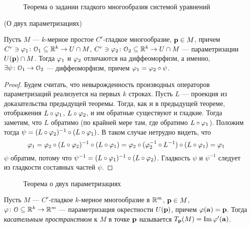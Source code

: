 \begin{figure}[ht]
    \centering
    \caption{Теорема о задании гладкого многообразия системой уравнений}
\end{figure}

\begin{corollary}(О двух параметризациях)

    Пусть $M$ --- $k$-мерное простое $C^r$-гладкое многообразие, $\mathbf{p} \in M$,
    причем $C^r \ni \varphi_1 \colon \mathcal{O}_1 \subseteq \mathbb{R}^k \to U \cap M$,
    $C^r \ni \varphi_2 \colon \mathcal{O}_2 \subseteq \mathbb{R}^k \to U \cap M$ --- параметризации
    $U(\mathbf{p}) \cap M$. Тогда $\varphi_1$ и $\varphi_2$ отличаются на диффеоморфизм, а
    именно, $\exists \psi \colon \mathcal{O}_1 \to \mathcal{O}_2$ --- диффеоморфизм, причем
    $\varphi_1 = \varphi_2 \circ \psi$.
\end{corollary}
\begin{proof}
    Будем считать, что невырожденность производных операторов параметризаций
    реализуется на первых $k$ строках. Пусть $L$ --- проекция из доказательства
    предыдущей теоремы. Тогда, как и в предыдущей теореме, отображения
    $L \circ \varphi_1$, $L \circ \varphi_2$, и им обратные существуют и гладкие.
    Тогда заметим, что $L$ обратимо (по крайней мере там, где обратимо $L \circ \varphi_1$).
    Положим тогда $\psi = (L \circ \varphi_2)^{-1} \circ (L \circ \varphi_1)$. В таком случае
    нетрудно видеть, что
\[
    \varphi_1 = \varphi_2 \circ (L \circ \varphi_2)^{-1} \circ (L \circ \varphi_1) =
    \varphi_2 \circ (\varphi_2^{-1} \circ L^{-1}) \circ (L \circ \varphi_1) = \varphi_1
\]
    $\psi$ обратим, потому что $\psi^{-1} = (L \circ \varphi_1)^{-1} \circ (L \circ \varphi_2)$.
    Гладкость $\psi$ и $\psi^{-1}$ следует из гладкости составных частей $\psi$.
\end{proof}

\begin{figure}[ht]
    \centering
    \caption{Теорема о двух параметризациях}
\end{figure}

\newpage

\begin{definition}

    Пусть $M$ --- $C^r$-гладкое $k$-мерное многообразие в $\mathbb{R}^m$, $\mathbf{p} \in M$,
    \\ $\varphi \colon \mathcal{O} \subseteq \mathbb{R}^k \to \mathbb{R}^m$ --- параметризация окрестности
    $U(\mathbf{p})$, причем $\varphi(\mathbf{a}) = \mathbf{p}$. Тогда \textit{касательным
    пространством} к $M$ в точке $\mathbf{p}$ называется $T_{\mathbf{p}}(M) = \operatorname{Im}{\varphi'(\mathbf{a})}$.
\end{definition}


